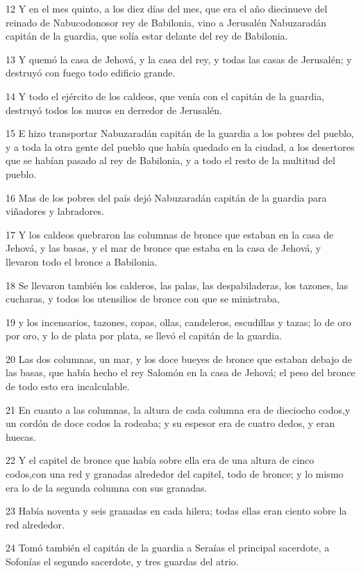 \par 12 Y en el mes quinto, a los diez días del mes, que era el año diecinueve del reinado de Nabucodonosor rey de Babilonia, vino a Jerusalén Nabuzaradán capitán de la guardia, que solía estar delante del rey de Babilonia.
\par 13 Y quemó la casa de Jehová, y la casa del rey, y todas las casas de Jerusalén; y destruyó con fuego todo edificio grande.
\par 14 Y todo el ejército de los caldeos, que venía con el capitán de la guardia, destruyó todos los muros en derredor de Jerusalén.
\par 15 E hizo transportar Nabuzaradán capitán de la guardia a los pobres del pueblo, y a toda la otra gente del pueblo que había quedado en la ciudad, a los desertores que se habían pasado al rey de Babilonia, y a todo el resto de la multitud del pueblo.
\par 16 Mas de los pobres del país dejó Nabuzaradán capitán de la guardia para viñadores y labradores.
\par 17 Y los caldeos quebraron las columnas de bronce que estaban en la casa de Jehová, y las basas, y el mar de bronce que estaba en la casa de Jehová, y llevaron todo el bronce a Babilonia.
\par 18 Se llevaron también los calderos, las palas, las despabiladeras, los tazones, las cucharas, y todos los utensilios de bronce con que se ministraba,
\par 19 y los incensarios, tazones, copas, ollas, candeleros, escudillas y tazas; lo de oro por oro, y lo de plata por plata, se llevó el capitán de la guardia.
\par 20 Las dos columnas, un mar, y los doce bueyes de bronce que estaban debajo de las basas, que había hecho el rey Salomón en la casa de Jehová; el peso del bronce de todo esto era incalculable.
\par 21 En cuanto a las columnas, la altura de cada columna era de dieciocho codos,y un cordón de doce codos la rodeaba; y su espesor era de cuatro dedos, y eran huecas.
\par 22 Y el capitel de bronce que había sobre ella era de una altura de cinco codos,con una red y granadas alrededor del capitel, todo de bronce; y lo mismo era lo de la segunda columna con sus granadas.
\par 23 Había noventa y seis granadas en cada hilera; todas ellas eran ciento sobre la red alrededor.
\par 24 Tomó también el capitán de la guardia a Seraías el principal sacerdote, a Sofonías el segundo sacerdote, y tres guardas del atrio.
